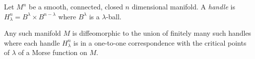 \documentclass[12pt]{article}
\begin{document}
Let $M^n$ be a smooth, connected, closed $n$ dimensional manifold.
A {\em handle} is $H_{\lambda}^n = B^{\lambda} \times B^{n-\lambda}$ where $B^{\lambda}$ is a $\lambda$-ball.

Any such manifold $M$ is diffeomorphic to the union of finitely many such handles where each handle $H_{\lambda}^n$ is in a one-to-one correspondence with the critical points of  $\lambda$ of a Morse function on $M$.
\end{document}
